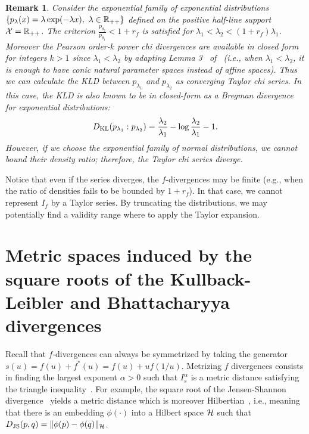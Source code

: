 \documentclass[journal]{IEEEtran}
\newtheorem{remark}[theorem]{Remark}
\begin{document}
\begin{remark}
Consider the exponential family of exponential distributions $\{p_\lambda(x)=\lambda\exp(-\lambda x),\ \lambda\in\bbR_{++}\}$ defined on the positive half-line support $\mathcal{X}={\mathbb{R}}_{++}$. The criterion $\frac{p_{\theta_2}}{p_{\theta_1}}<1+r_f$ is satisfied for $\lambda_1<\lambda_2<(1+r_f)\lambda_1$.
Moreover the Pearson order-$k$ power chi divergences are available in closed form for integers $k>1$ since $\lambda_1<\lambda_2$ by adapting Lemma 3~ of~\cite{fdivchi-2013} (i.e., when $\lambda_1<\lambda_2$, it is enough to have conic natural parameter spaces instead of affine spaces).
Thus we can calculate the KLD between $p_{\lambda_1}$ and $p_{\lambda_2}$ as converging Taylor chi series.
In this case, the KLD is also known to be in closed-form as a Bregman divergence for exponential distributions:
$$
D_{\mathrm{KL}}(p_{\lambda_1}:p_{\lambda_2})=\frac{\lambda_2}{\lambda_1}-\log\frac{\lambda_2}{\lambda_1}-1.
$$
However, if we choose the exponential family of normal distributions, we cannot bound their density ratio; therefore, the Taylor chi series diverge.
\end{remark}


Notice that even if the series diverges, the $f$-divergences may be finite 
(e.g., when the ratio of densities fails to be bounded by $1+r_f$).
In that case, we cannot represent $I_f$ by a Taylor series.
By truncating the distributions, we may potentially find a validity range where to apply the Taylor expansion.




\section{Metric spaces induced by the square roots of the Kullback-Leibler and Bhattacharyya divergences}\label{sec:metrization}



Recall that $f$-divergences can always be symmetrized by taking the generator $s(u) = f(u)+f^*(u)= f(u)+u f(1/u)$.
Metrizing $f$ divergences consists in finding the largest exponent $\alpha>0$ such that $I_s^\alpha$ is a metric distance satisfying the triangle inequality~\cite{Kafka-1991,OsterreicherVajda-2003,Vajda-MetricDivergence-2009}.
For example, the square root of the Jensen-Shannon divergence~\cite{fuglede2004jensen} yields a metric distance which is moreover Hilbertian~\cite{acharyya2013bregman}, i.e., meaning that there is an embedding $\phi(\cdot)$ into a Hilbert space $\mathcal{H}$ such that $D_{\mathrm{JS}}(p,q)=\|\phi(p)-\phi(q)\|_{\mathcal{H}}$. 
\end{document}
